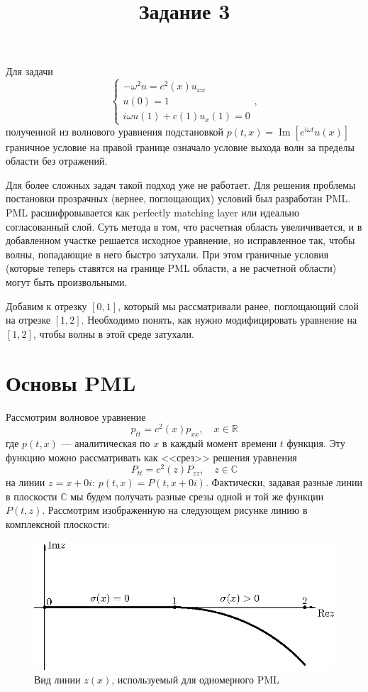 \documentclass[12pt]{article}
\title{Задание 3}
\date{}
\begin{document}
\maketitle

Для задачи 
\begin{equation}
\begin{cases}
-\omega^2 u = c^2(x) u_{xx}\\
u(0) = 1\\
i\omega u(1) + c(1) u_x(1) = 0
\end{cases},
\label{eq:stationary}
\end{equation}
полученной из волнового уравнения подстановкой $p(t,x) =
\operatorname{Im}\left[e^{i\omega t} u(x)\right]$ граничное условие на правой
границе означало условие выхода волн за пределы области без отражений.

Для более сложных задач такой подход уже не работает. Для решения проблемы
постановки прозрачных (вернее, поглощающих) условий был разработан PML. PML
расшифровывается как perfectly matching layer или идеально согласованный слой.
Суть метода в том, что расчетная область увеличивается, и в добавленном участке
решается исходное уравнение, но исправленное так, чтобы волны, попадающие в него
быстро затухали. При этом граничные условия (которые теперь ставятся на границе
PML области, а не расчетной области) могут быть произвольными.

Добавим к отрезку $[0, 1]$, который мы рассматривали ранее, поглощающий слой на
отрезке $[1, 2]$. Необходимо понять, как нужно модифицировать уравнение на $[1,
2]$, чтобы волны в этой среде затухали.

\section{Основы PML}

Рассмотрим волновое уравнение
\[
p_{tt} = c^2(x) p_{xx},\quad x \in \mathbb{R}
\]
где $p(t, x)$ --- аналитическая по $x$ в каждый момент времени $t$ функция. 
Эту функцию можно рассматривать как <<срез>> решения уравнения
\[
P_{tt} = c^2(z) P_{zz},\quad z \in \mathbb{C}
\]
на линии $z = x + 0i$: $p(t, x) = P(t, x + 0i)$. 
Фактически, задавая разные линии в плоскости $\mathbb{C}$ мы будем получать
разные срезы одной и той же функции $P(t, z)$. 
Рассмотрим изображенную на следующем рисунке линию в комплексной плоскости:
\begin{figure}[ht!]
\centering
\includegraphics[width=.8\textwidth]{func-0.eps}
\caption{Вид линии $z(x)$, используемый для одномерного PML}
\end{figure}
\end{document}
